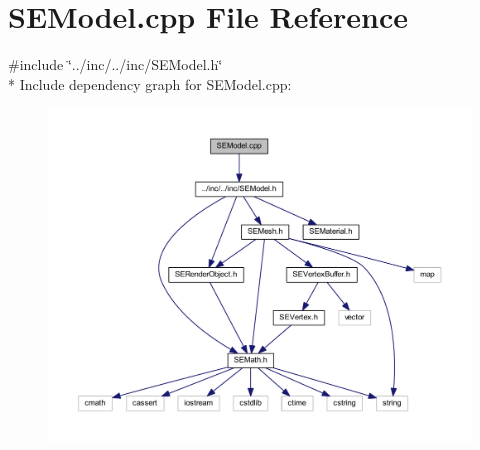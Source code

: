 \section{S\+E\+Model.\+cpp File Reference}
\label{_s_e_model_8cpp}
{\ttfamily \#include \char`\"{}../inc/../inc/\+S\+E\+Model.\+h\char`\"{}}\\*
Include dependency graph for S\+E\+Model.\+cpp\+:
\nopagebreak
\begin{figure}[H]
\begin{center}
\leavevmode
\includegraphics[width=350pt]{_s_e_model_8cpp__incl}
\end{center}
\end{figure}
